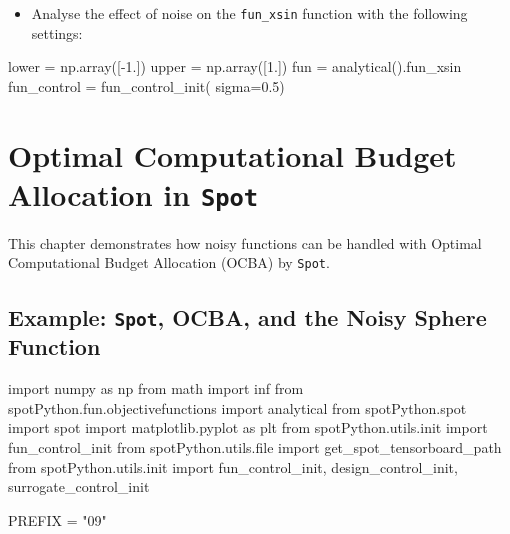 \documentclass[
  letterpaper,
  DIV=11,
  numbers=noendperiod]{scrreprt}
\newenvironment{Shaded}{\begin{snugshade}}{\end{snugshade}}
\newcommand{\BuiltInTok}[1]{\textcolor[rgb]{0.00,0.23,0.31}{#1}}
\newcommand{\FloatTok}[1]{\textcolor[rgb]{0.68,0.00,0.00}{#1}}
\newcommand{\ImportTok}[1]{\textcolor[rgb]{0.00,0.46,0.62}{#1}}
\newcommand{\NormalTok}[1]{\textcolor[rgb]{0.00,0.23,0.31}{#1}}
\newcommand{\OperatorTok}[1]{\textcolor[rgb]{0.37,0.37,0.37}{#1}}
\newcommand{\StringTok}[1]{\textcolor[rgb]{0.13,0.47,0.30}{#1}}
\providecommand{\tightlist}{%
  \setlength{\itemsep}{0pt}\setlength{\parskip}{0pt}}\usepackage{longtable,booktabs,array}
\begin{document}
\begin{itemize}
\tightlist
\item
  Analyse the effect of noise on the \texttt{fun\_xsin} function with
  the following settings:
\end{itemize}

\begin{Shaded}
\begin{Highlighting}[]
\NormalTok{lower }\OperatorTok{=}\NormalTok{ np.array([}\OperatorTok{{-}}\FloatTok{1.}\NormalTok{])}
\NormalTok{upper }\OperatorTok{=}\NormalTok{ np.array([}\FloatTok{1.}\NormalTok{])}
\NormalTok{fun }\OperatorTok{=}\NormalTok{ analytical().fun\_xsin}
\NormalTok{fun\_control }\OperatorTok{=}\NormalTok{ fun\_control\_init(    }
\NormalTok{    sigma}\OperatorTok{=}\FloatTok{0.5}\NormalTok{)}
\end{Highlighting}
\end{Shaded}

\chapter{\texorpdfstring{Optimal Computational Budget Allocation in
\texttt{Spot}}{Optimal Computational Budget Allocation in Spot}}\label{sec-ocba}

This chapter demonstrates how noisy functions can be handled with
Optimal Computational Budget Allocation (OCBA) by \texttt{Spot}.

\section{\texorpdfstring{Example: \texttt{Spot}, OCBA, and the Noisy
Sphere
Function}{Example: Spot, OCBA, and the Noisy Sphere Function}}\label{example-spot-ocba-and-the-noisy-sphere-function}

\begin{Shaded}
\begin{Highlighting}[]
\ImportTok{import}\NormalTok{ numpy }\ImportTok{as}\NormalTok{ np}
\ImportTok{from}\NormalTok{ math }\ImportTok{import}\NormalTok{ inf}
\ImportTok{from}\NormalTok{ spotPython.fun.objectivefunctions }\ImportTok{import}\NormalTok{ analytical}
\ImportTok{from}\NormalTok{ spotPython.spot }\ImportTok{import}\NormalTok{ spot}
\ImportTok{import}\NormalTok{ matplotlib.pyplot }\ImportTok{as}\NormalTok{ plt}
\ImportTok{from}\NormalTok{ spotPython.utils.init }\ImportTok{import}\NormalTok{ fun\_control\_init}
\ImportTok{from}\NormalTok{ spotPython.utils.}\BuiltInTok{file} \ImportTok{import}\NormalTok{ get\_spot\_tensorboard\_path}
\ImportTok{from}\NormalTok{ spotPython.utils.init }\ImportTok{import}\NormalTok{ fun\_control\_init, design\_control\_init, surrogate\_control\_init}

\NormalTok{PREFIX }\OperatorTok{=} \StringTok{"09"}
\end{Highlighting}
\end{Shaded}
\end{document}
